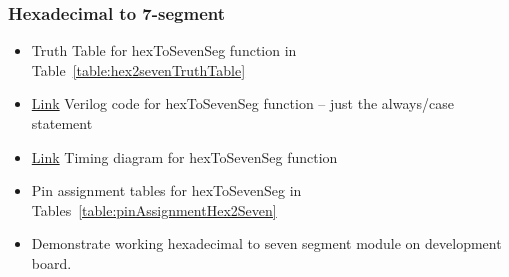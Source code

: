 \subsubsection{Hexadecimal to 7-segment}
\begin{itemize}
\item  Truth Table for hexToSevenSeg function in Table~\ref{table:hex2sevenTruthTable}
\item \protect\hyperlink{Hex2Seven_Verilog}{Link} Verilog code for hexToSevenSeg function -- just the always/case statement
\item \protect\hyperlink{Hex2Seven_Waveform}{Link} Timing diagram for hexToSevenSeg function
\item Pin assignment tables for hexToSevenSeg  in Tables~\ref{table:pinAssignmentHex2Seven}
\item Demonstrate working hexadecimal to seven segment module on development board.
\end{itemize}



